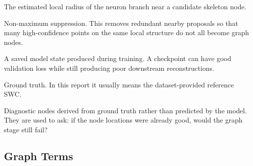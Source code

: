 \documentclass[11pt]{article}
\begin{document}
\begin{description}[leftmargin=3.6cm]
  \item[Radius] The estimated local radius of the neuron branch near a
  candidate skeleton node.

  \item[NMS] Non-maximum suppression. This removes redundant nearby proposals
  so that many high-confidence points on the same local structure do not all
  become graph nodes.

  \item[Checkpoint] A saved model state produced during training. A checkpoint
  can have good validation loss while still producing poor downstream
  reconstructions.

  \item[GT] Ground truth. In this report it usually means the dataset-provided
  reference SWC.

  \item[Oracle nodes] Diagnostic nodes derived from ground truth rather than
  predicted by the model. They are used to ask: if the node locations were
  already good, would the graph stage still fail?
\end{description}

\subsection{Graph Terms}
\end{document}
